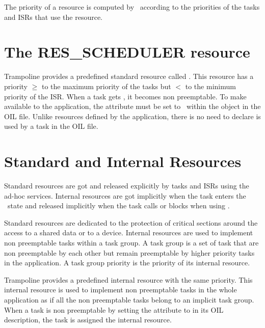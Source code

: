 The priority of a resource is computed by \goil\ according to the priorities of the tasks and ISRs that use the resource.

\section{The {\normalsize\ttfamily RES_SCHEDULER} resource}

Trampoline provides a predefined standard resource called . This resource has a priority $\ge$ to the maximum priority of the tasks but $<$ to the minimum priority of the ISR. When a task gets , it becomes non preemptable. To make  available to the application, the  attribute must be set to \TRUE\ within the  object in the OIL file. Unlike resources defined by the application, there is no need to declare  is used by a task in the OIL file.

\section{Standard and Internal Resources}

Standard resources are got and released explicitly by tasks and ISRs using the ad-hoc services. Internal resources are got implicitly when the task enters the \RUNNING\ state and released implicitly when the task calls  or blocks when using .


Standard resources are dedicated to the protection of critical sections around the access to a shared data or to a device. Internal resources are used to implement non preemptable tasks within a task group.
A task group is a set of task that are non preemptable by each other but remain preemptable by higher priority tasks in the application. A task group priority is the priority of its internal resource.

Trampoline provides a predefined internal  resource with the same priority. This internal resource is used to implement non preemptable tasks in the whole application as if all the non preemptable tasks belong to an implicit task group. When a task is non preemptable by setting the  attribute to  in its OIL description, the task is assigned the internal  resource.

